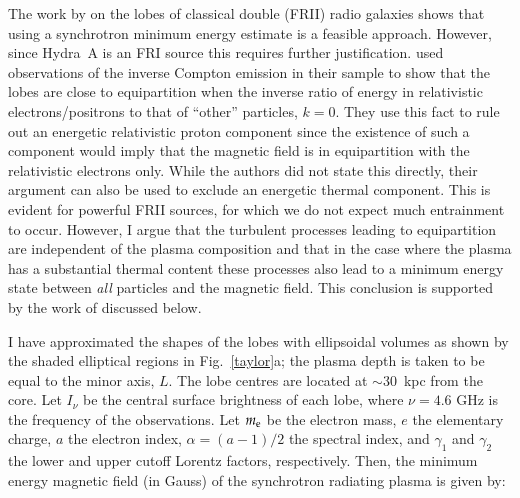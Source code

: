 The work by \citet{croston05a} on the lobes of classical double (FRII) radio galaxies shows that using a synchrotron minimum energy estimate is a feasible approach. However, since Hydra~A is an FRI source this requires further justification. \citet{croston05a} used observations of the inverse Compton emission in their sample to show that the lobes are close to equipartition when the inverse ratio of energy in relativistic electrons/positrons to that of ``other'' particles, $k=0$. They use this fact to rule out an energetic relativistic proton component since the existence of such a component would imply that the magnetic field is in equipartition with the relativistic electrons only. While the authors did not state this directly, their argument can also be used to exclude an energetic thermal component. This is evident for powerful FRII sources, for which we do not expect much entrainment to occur. However, I argue that the turbulent processes leading to equipartition are independent of the plasma composition and that in the case where the plasma has a substantial thermal content these processes also lead to a minimum energy state between \emph{all} particles and the magnetic field. This conclusion is supported by the work of \citet{birzan08} discussed below.     

I have approximated the shapes of the lobes with ellipsoidal volumes as shown by the shaded elliptical regions in Fig.~\ref{taylor}a; the plasma depth is taken to be equal to the minor axis, $L$. The lobe centres are located at $\sim 30$~kpc from the core. Let $I_\nu$ be the central surface brightness of each lobe, where $\nu=4.6$ GHz is the frequency of the \citet{taylor90} observations. Let $m_{\rm{e}}$ be the electron mass, $e$ the elementary charge, $a$ the electron index, $\alpha=(a-1)/2$ the spectral index, and $\gamma_1$ and $\gamma_2$ the lower and upper cutoff Lorentz factors, respectively. Then, the minimum energy magnetic field (in Gauss) \citep[e.g][]{bicknell13a} of the synchrotron radiating plasma is given by: 

